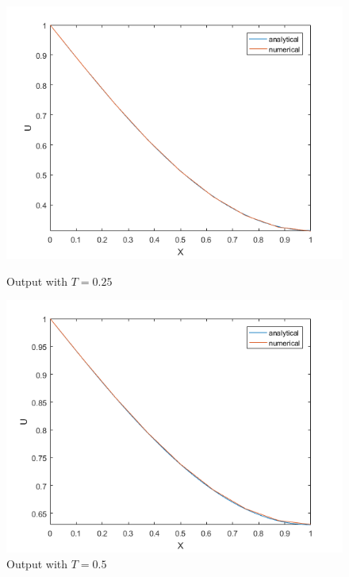 \documentclass[10pt,a4paper]{report}
\begin{document}
\begin{figure}[ht]
\begin{minipage}[b]{0.5\linewidth}
\centering
\includegraphics[width=\textwidth]{3ii025}
\caption{Output with $T=0.25$}
\end{minipage}
\hspace{0.5cm}
\begin{minipage}[b]{0.5\linewidth}
\centering
\includegraphics[width=\textwidth]{3ii05}
\caption{Output with $T=0.5$}
\end{minipage}
\end{figure}
\end{document}
